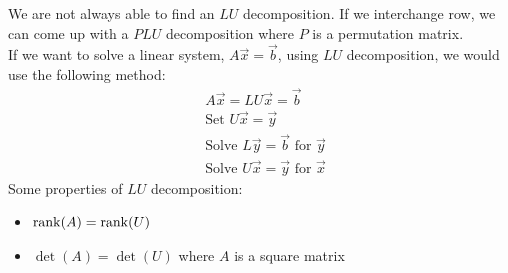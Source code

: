 \documentclass[11pt, fleqn]{article}
\begin{document}
We are not always able to find an $LU$ decomposition. If we interchange row, we can come up with a $PLU$ decomposition where $P$ is a permutation matrix.\\
If we want to solve a linear system, $A\vec{x}=\vec{b}$, using $LU$ decomposition, we would use the following method:
\begin{align*}
    &A\vec{x}=LU\vec{x}=\vec{b}\\
    &\text{Set }U\vec{x}=\vec{y}\\
    &\text{Solve }L\vec{y}=\vec{b}\text{ for }\vec{y}\\
    &\text{Solve }U\vec{x}=\vec{y}\text{ for }\vec{x}
\end{align*}
Some properties of $LU$ decomposition:
\begin{itemize}
    \item $\operatorname{rank}(A)=\operatorname{rank}(U)$
    \item $\det(A)=\det(U)$ where $A$ is a square matrix
\end{itemize}
\end{document}
